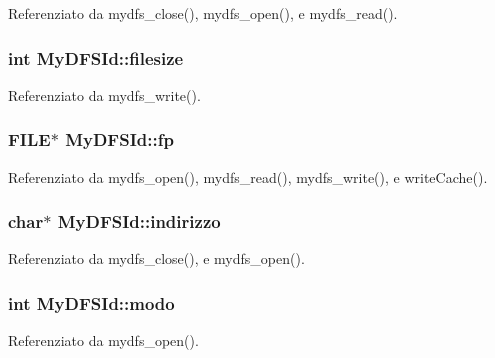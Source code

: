 Referenziato da mydfs\+\_\+close(), mydfs\+\_\+open(), e mydfs\+\_\+read().

\hypertarget{structMyDFSId_a2b7cf19c5ac22e03ae8abf7e688fee2a}{
\subsubsection[{filesize}]{\setlength{\rightskip}{0pt plus 5cm}int My\+D\+F\+S\+Id\+::filesize}}\label{structMyDFSId_a2b7cf19c5ac22e03ae8abf7e688fee2a}


Referenziato da mydfs\+\_\+write().

\hypertarget{structMyDFSId_ae2badd91d3b506420a9e49554df8212d}{
\subsubsection[{fp}]{\setlength{\rightskip}{0pt plus 5cm}F\+I\+L\+E$\ast$ My\+D\+F\+S\+Id\+::fp}}\label{structMyDFSId_ae2badd91d3b506420a9e49554df8212d}


Referenziato da mydfs\+\_\+open(), mydfs\+\_\+read(), mydfs\+\_\+write(), e write\+Cache().

\hypertarget{structMyDFSId_ac8c10a1a5b18776bf5e5585ee9e26331}{
\subsubsection[{indirizzo}]{\setlength{\rightskip}{0pt plus 5cm}char$\ast$ My\+D\+F\+S\+Id\+::indirizzo}}\label{structMyDFSId_ac8c10a1a5b18776bf5e5585ee9e26331}


Referenziato da mydfs\+\_\+close(), e mydfs\+\_\+open().

\hypertarget{structMyDFSId_a98bc5ce1a7734459d8b81c997da4e9f0}{
\subsubsection[{modo}]{\setlength{\rightskip}{0pt plus 5cm}int My\+D\+F\+S\+Id\+::modo}}\label{structMyDFSId_a98bc5ce1a7734459d8b81c997da4e9f0}


Referenziato da mydfs\+\_\+open().

